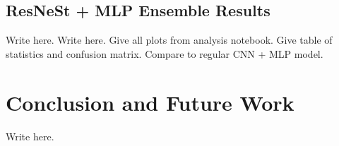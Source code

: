 \documentclass [MAS] {uclathes}
\begin{document}
\section{ResNeSt + MLP Ensemble Results}

Write here. Write here. Give all plots from analysis notebook. Give table of statistics and confusion matrix. Compare to regular CNN + MLP model.


\chapter{Conclusion and Future Work}

Write here.



\end{document}
